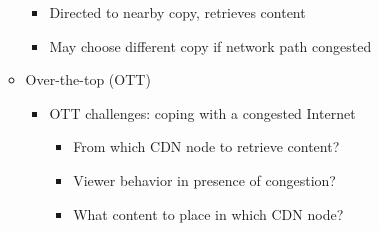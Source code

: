 \begin{itemize}
\begin{itemize}
        \begin{itemize}

          \item Directed to nearby copy, retrieves content

          \item May choose different copy if network path congested

        \end{itemize}

      \item Over-the-top (OTT)

        \begin{itemize}

          \item OTT challenges: coping with a congested Internet

            \begin{itemize}

              \item From which CDN node to retrieve content?

              \item Viewer behavior in presence of congestion?

              \item What content to place in which CDN node?

            \end{itemize}

        \end{itemize}

    \end{itemize}

\end{itemize}



